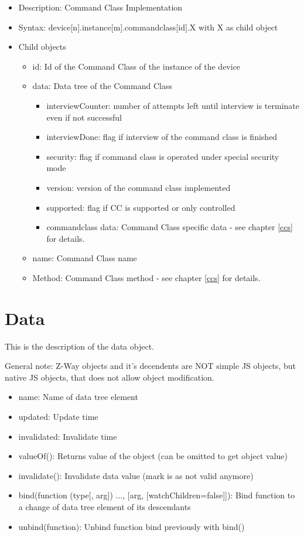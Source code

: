 \begin {itemize}
\item Description: Command Class Implementation
\item Syntax:  device[n].instance[m].commandclass[id].X with  X as child object
\item Child objects
\begin {itemize}
\item id: Id of the Command Class of the instance of the device
\item data: Data tree of the Command Class
\begin {itemize}
\item interviewCounter: number of attempts left until interview is terminate even if not successful
\item interviewDone: flag if interview of the command class is finished
\item security: flag if command class is operated under special security mode
\item version: version of the command class implemented
\item supported: flag if CC is supported or only controlled
\item {commandclass data}: Command Class specific data - see chapter \ref{ccs} for details.
\end {itemize}
\item name: Command Class name
\item {Method}: Command Class method - see chapter \ref{ccs} for details.
\end {itemize}
\end {itemize}

\section{Data}

This is the description of the data object.

General note: Z-Way objects and it's decendents are NOT simple JS objects, but native JS objects, 
that does not allow object modification.

\begin {itemize}
\item name: Name of data tree element
\item updated: Update time
\item invalidated: Invalidate time
\item valueOf(): Returns value of the object (can be omitted to get object value)
\item invalidate(): Invalidate data value (mark is as not valid anymore)
\item bind(function (type[, arg]) {...}, [arg, [watchChildren=false]]): Bind function to a change of data tree element of its descendants
\item unbind(function): Unbind function bind previously with bind()
\end {itemize}

 
